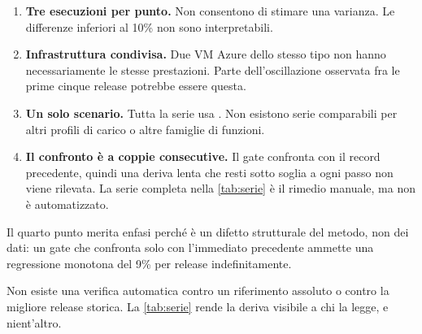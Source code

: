 \begin{enumerate}[leftmargin=*]
  \item \textbf{Tre esecuzioni per punto.} Non consentono di stimare una
  varianza. Le differenze inferiori al 10\% non sono interpretabili.

  \item \textbf{Infrastruttura condivisa.} Due VM Azure dello stesso tipo non
  hanno necessariamente le stesse prestazioni. Parte dell'oscillazione osservata
  fra le prime cinque release potrebbe essere questa.

  \item \textbf{Un solo scenario.} Tutta la serie usa
  . Non esistono serie comparabili per altri profili
  di carico o altre famiglie di funzioni.

  \item \textbf{Il confronto \`e a coppie consecutive.} Il gate confronta con il
  record precedente, quindi una deriva lenta che resti sotto soglia a ogni passo
  non viene rilevata. La serie completa nella \cref{tab:serie} \`e il rimedio
  manuale, ma non \`e automatizzato.
\end{enumerate}

Il quarto punto merita enfasi perch\'e \`e un difetto strutturale del metodo, non
dei dati: un gate che confronta solo con l'immediato precedente ammette una
regressione monotona del 9\% per release indefinitamente.

\begin{damisurare}
Non esiste una verifica automatica contro un riferimento assoluto o contro la
migliore release storica. La \cref{tab:serie} rende la deriva visibile a chi la
legge, e nient'altro.
\end{damisurare}
